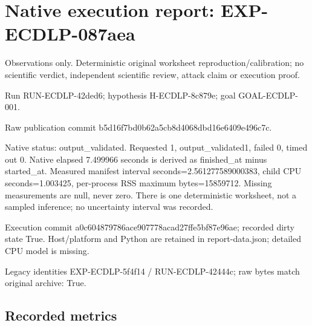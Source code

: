 \documentclass[10pt]{article}
\begin{document}
\section*{Native execution report: EXP-ECDLP-087aea}
\noindent Observations only. Deterministic original worksheet reproduction/calibration; no scientific verdict, independent scientific review, attack claim or execution proof.\par\medskip
\noindent Run RUN-ECDLP-42ded6; hypothesis H-ECDLP-8c879e; goal GOAL-ECDLP-001.\par
\noindent Raw publication commit b5d16f7bd0b62a5cb8d4068dbd16e6409e496c7c.\par\medskip
Native status: output\_validated. Requested 1, output\_validated1, failed 0, timed out 0. Native elapsed 7.499966 seconds is derived as finished\_at minus started\_at. Measured manifest interval seconds=2.561277589000383, child CPU seconds=1.003425, per-process RSS maximum bytes=15859712. Missing measurements are null, never zero. There is one deterministic worksheet, not a sampled inference; no uncertainty interval was recorded.\par\medskip
Execution commit a0c604879786ace907778acad27ffe5bf87e96ae; recorded dirty state True. Host/platform and Python are retained in report-data.json; detailed CPU model is missing.\par\medskip
Legacy identities EXP-ECDLP-5f4f14 / RUN-ECDLP-42444c; raw bytes match original archive: True.
\subsection*{Recorded metrics}

\end{document}
